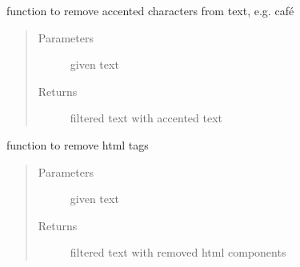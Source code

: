 \documentclass[letterpaper,10pt,english]{sphinxmanual}
\begin{document}
\begin{fulllineitems}
\label{\detokenize{index:data_preprocessing.data_preprocessing_functions.remove_accented_chars}}
\sphinxAtStartPar
function to remove accented characters from text, e.g. café
\begin{quote}\begin{description}
\item[{Parameters}] \leavevmode
\sphinxAtStartPar
{} \textendash{} given text

\item[{Returns}] \leavevmode
\sphinxAtStartPar
filtered text with accented text

\end{description}\end{quote}

\end{fulllineitems}


\begin{fulllineitems}
\label{\detokenize{index:data_preprocessing.data_preprocessing_functions.remove_html_tags}}
\sphinxAtStartPar
function to remove html tags
\begin{quote}\begin{description}
\item[{Parameters}] \leavevmode
\sphinxAtStartPar
{} \textendash{} given text

\item[{Returns}] \leavevmode
\sphinxAtStartPar
filtered text with removed html components

\end{description}\end{quote}

\end{fulllineitems}

\end{document}
